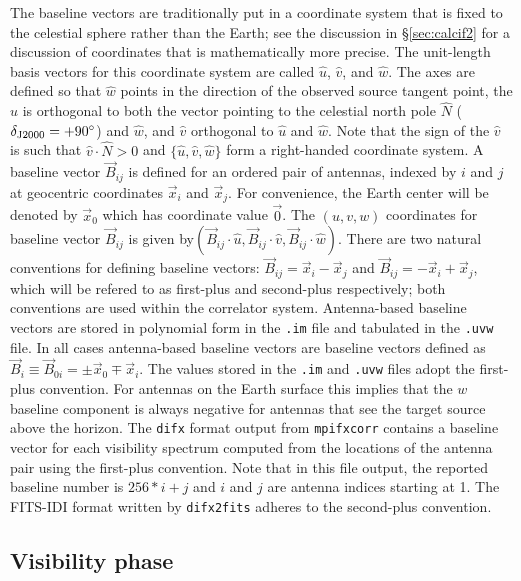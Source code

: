 The baseline vectors are traditionally put in a coordinate system that is fixed to the celestial sphere rather than the Earth; see the discussion in \S\ref{sec:calcif2} for a discussion of coordinates that is mathematically more precise.
The unit-length basis vectors for this coordinate system are called $\hat{u}$, $\hat{v}$, and $\hat{w}$.
The axes are defined so that $\hat{w}$ points in the direction of the observed source tangent point, the $\hat{u}$ is orthogonal to both the vector pointing to the celestial north pole $\hat{N}$ ($\delta_{\rm J2000} = +90^{\circ}$) and $\hat{w}$, and $\hat{v}$ orthogonal to $\hat{u}$ and $\hat{w}$.  
Note that the sign of the $\hat{v}$ is such that $\hat{v} \cdot \hat{N} > 0$ and $\{\hat{u}, \hat{v}, \hat{w}\}$ form a right-handed coordinate system.
A baseline vector $\vec{B}_{ij}$ is defined for an ordered pair of antennas, indexed by $i$ and $j$ at geocentric coordinates $\vec{x}_i$ and $\vec{x}_j$.
For convenience, the Earth center will be denoted by $\vec{x}_0$ which has coordinate value $\vec{0}$.
The $(u, v, w)$ coordinates for baseline vector $\vec{B}_{ij}$ is given by$(\vec{B}_{ij} \cdot \hat{u}, \vec{B}_{ij} \cdot \hat{v}, \vec{B}_{ij} \cdot \hat{w})$.
There are two natural conventions for defining baseline vectors: $\vec{B}_{ij} = \vec{x}_i - \vec{x}_j$ and $\vec{B}_{ij}  = -\vec{x}_i + \vec{x}_j$, which will be refered to as first-plus and second-plus respectively; both conventions are used within the correlator system.
Antenna-based baseline vectors are stored in polynomial form in the {\tt .im} file and tabulated in the {\tt .uvw} file.
In all cases antenna-based baseline vectors are baseline vectors defined as $\vec{B}_i \equiv \vec{B}_{0i} = \pm \vec{x}_0 \mp \vec{x}_i$.
The values stored in the {\tt .im} and {\tt .uvw} files adopt the first-plus convention.
For antennas on the Earth surface this implies that the $w$ baseline component is always negative for antennas that see the target source above the horizon.
The {\tt difx} format output from {\tt mpifxcorr} contains a baseline vector for each visibility spectrum computed from the locations of the antenna pair using the first-plus convention.
Note that in this file output, the reported baseline number is $256*i + j$ and $i$ and $j$ are antenna indices starting at 1.
The FITS-IDI format written by {\tt difx2fits} adheres to the second-plus convention.

\subsection{Visibility phase} \label{phaseconventions}
